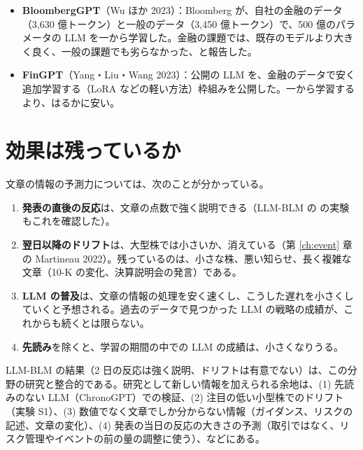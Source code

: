 \begin{itemize}
\item \textbf{BloombergGPT}（Wu ほか 2023）\cite{bloomberggpt2023}：Bloomberg が、自社の金融のデータ（3,630 億トークン）と一般のデータ（3,450 億トークン）で、500 億のパラメータの LLM を一から学習した。金融の課題では、既存のモデルより大きく良く、一般の課題でも劣らなかった、と報告した。
\item \textbf{FinGPT}（Yang・Liu・Wang 2023）\cite{fingpt2023}：公開の LLM を、金融のデータで安く追加学習する（LoRA などの軽い方法）枠組みを公開した。一から学習するより、はるかに安い。
\end{itemize}

\section{効果は残っているか}

文章の情報の予測力については、次のことが分かっている。

\begin{enumerate}
\item \textbf{発表の直後の反応}は、文章の点数で強く説明できる（LLM-BLM の \SP{} の実験もこれを確認した）。
\item \textbf{翌日以降のドリフト}は、大型株では小さいか、消えている（第 \ref{ch:event} 章の Martineau 2022）。残っているのは、小さな株、悪い知らせ、長く複雑な文章（10-K の変化、決算説明会の発言）である。
\item \textbf{LLM の普及}は、文章の情報の処理を安く速くし、こうした遅れを小さくしていくと予想される。過去のデータで見つかった LLM の戦略の成績が、これからも続くとは限らない。
\item \textbf{先読み}を除くと、学習の期間の中での LLM の成績は、小さくなりうる。
\end{enumerate}

\begin{projbox}
LLM-BLM の結果（2 日の反応は強く説明、ドリフトは有意でない）は、この分野の研究と整合的である。研究として新しい情報を加えられる余地は、(1) 先読みのない LLM（ChronoGPT）での検証、(2) 注目の低い小型株でのドリフト（実験 S1）、(3) 数値でなく文章でしか分からない情報（ガイダンス、リスクの記述、文章の変化）、(4) 発表の当日の反応の大きさの予測（取引ではなく、リスク管理やイベントの前の量の調整に使う）、などにある。
\end{projbox}
